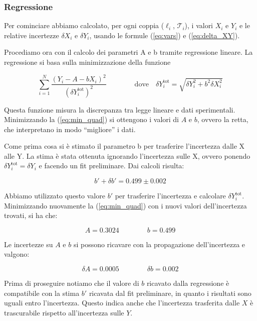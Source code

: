 \subsubsection{Regressione}
\label{l_regressione}

Per cominciare abbiamo calcolato, per ogni coppia ($\ell_i$, $\mathcal{T}_i$), i valori $X_i$ e $Y_i$
e le relative incertezze $\delta X_i$ e $\delta Y_i$, usando le formule (\ref{eq:vars}) e (\ref{eq:delta_XY}).

Procediamo ora con il calcolo dei parametri A e b tramite regressione lineare. 
La regressione si basa sulla minimizzazione della funzione

\begin{equation}
    \sum_{i=1}^N \frac{(Y_i - A - bX_i)^2}{(\delta Y_i^{\text{tot}})^2}
    \qquad \qquad \text{dove} \quad
    \delta Y_i^{\text{tot}} = \sqrt{\delta Y_i^2 + b^2 \delta X_i^2}
    \label{eq:min_quad}
\end{equation}

Questa funzione misura la discrepanza tra legge lineare e dati sperimentali. Minimizzando la (\ref{eq:min_quad}) si ottengono
i valori di $A$ e $b$, ovvero la retta, che interpretano in modo ``migliore'' i dati.

Come prima cosa si è stimato il parametro b per trasferire l'incertezza dalle X alle Y.
La stima è stata ottenuta ignorando l'incertezza sulle X, ovvero ponendo $\delta Y_i^{\text{tot}} = \delta Y_i$ e facendo un fit preliminare.
Dai calcoli risulta:

\begin{equation}
    b' + \delta b' = 0.499 \pm 0.002
\end{equation}

Abbiamo utilizzato questo valore $b'$ per trasferire l'incertezza e calcolare $\delta Y_i^{\text{tot}}$. Minimizzando nuovamente la 
(\ref{eq:min_quad}) con i nuovi valori dell'incertezza trovati, si ha che:

\begin{equation}
    A = 0.3024 \qquad \qquad b = 0.499
\end{equation}

Le incertezze su $A$ e $b$ si possono ricavare con la propagazione dell'incertezza e valgono:

\begin{equation}
    \delta A = 0.0005 \qquad \qquad \delta b = 0.002
\end{equation}

Prima di proseguire notiamo che il valore di $b$ ricavato dalla regressione è compatibile con la stima $b'$
ricavata dal fit preliminare, in quanto i risultati sono uguali entro l'incertezza. Questo indica anche che
l'incertezza trasferita dalle $X$ è trascurabile rispetto all'incertezza sulle $Y$.
